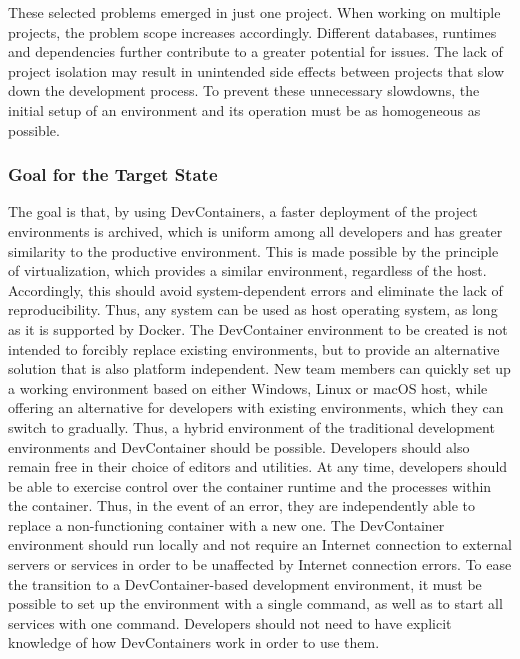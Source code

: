         These selected problems emerged in just one project. When working on multiple projects, the problem scope increases accordingly. Different databases, runtimes and dependencies further contribute to a greater potential for issues. The lack of project isolation may result in unintended side effects between projects that slow down the development process. To prevent these unnecessary slowdowns, the initial setup of an environment and its operation must be as homogeneous as possible.

        \subsubsection{Goal for the Target State}\label{sssec::goal}
        The goal is that, by using DevContainers, a faster deployment of the project environments is archived, which is uniform among all developers and has greater similarity to the productive environment. This is made possible by the principle of virtualization, which provides a similar environment, regardless of the host. Accordingly, this should avoid system-dependent errors and eliminate the lack of reproducibility. Thus, any system can be used as host operating system, as long as it is supported by Docker. The DevContainer environment to be created is not intended to forcibly replace existing environments, but to provide an alternative solution that is also platform independent. New team members can quickly set up a working environment based on either Windows, Linux or macOS host, while offering an alternative for developers with existing environments, which they can switch to gradually. Thus, a hybrid environment of the traditional development environments and DevContainer should be possible. Developers should also remain free in their choice of editors and utilities.\newline
        At any time, developers should be able to exercise control over the container runtime and the processes within the container. Thus, in the event of an error, they are independently able to replace a non-functioning container with a new one. The DevContainer environment should run locally and not require an Internet connection to external servers or services in order to be unaffected by Internet connection errors. To ease the transition to a DevContainer-based development environment, it must be possible to set up the environment with a single command, as well as to start all services with one command. Developers should not need to have explicit knowledge of how DevContainers work in order to use them.

